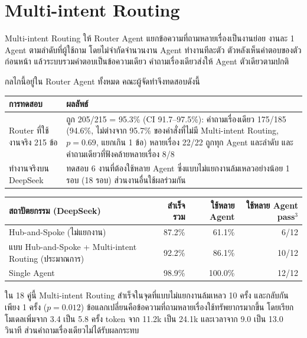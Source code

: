 \documentclass[12pt,a4paper]{article}
\begin{document}
\section{Multi-intent Routing}

Multi-intent Routing ให้ Router Agent แยกข้อความที่ถามหลายเรื่องเป็นงานย่อย งานละ 1 Agent ตามลำดับที่ผู้ใช้ถาม โดยไม่จำกัดจำนวนงาน Agent ทำงานทีละตัว ตัวหลังเห็นคำตอบของตัวก่อนหน้า แล้วระบบรวมคำตอบเป็นข้อความเดียว คำถามเรื่องเดียวส่งให้ Agent ตัวเดียวตามปกติ

กลไกนี้อยู่ใน Router Agent ทั้งหมด คณะผู้จัดทำจึงทดสอบดังนี้

\begin{table}[H]
\centering
\small
\begin{tabular}{L{4.3cm}L{11cm}}
\toprule
\textbf{การทดสอบ} & \textbf{ผลลัพธ์} \\
\midrule
Router ที่ใช้งานจริง 215 ข้อ & ถูก 205/215 = 95.3\% (CI 91.7--97.5\%): คำถามเรื่องเดียว 175/185 (94.6\%, ไม่ต่างจาก 95.7\% ของคำสั่งที่ไม่มี Multi-intent Routing, $p = 0.69$, แยกเกิน 1 ข้อ) หลายเรื่อง 22/22 ถูกทุก Agent และลำดับ และคำถามเดียวที่ฟังคล้ายหลายเรื่อง 8/8 \\
ทำงานจริงบน DeepSeek & ทดสอบ 6 งานที่ต้องใช้หลาย Agent ซึ่งแบบไม่แยกงานล้มเหลวอย่างน้อย 1 รอบ (18 รอบ) ส่วนงานอื่นใช้ผลร่วมกัน \\
\bottomrule
\end{tabular}
\end{table}

\begin{table}[H]
\centering
\small
\begin{tabular}{L{6.4cm}rrr}
\toprule
\textbf{สถาปัตยกรรม (DeepSeek)} & \textbf{สำเร็จรวม} & \textbf{ใช้หลาย Agent} & \textbf{ใช้หลาย Agent pass$^3$} \\
\midrule
Hub-and-Spoke (ไม่แยกงาน) & 87.2\% & 61.1\% & 6/12 \\
แบบ Hub-and-Spoke + Multi-intent Routing (ประมาณการ) & 92.2\% & 86.1\% & 10/12 \\
Single Agent & 98.9\% & 100.0\% & 12/12 \\
\bottomrule
\end{tabular}
\end{table}

ใน 18 คู่นี้ Multi-intent Routing สำเร็จในจุดที่แบบไม่แยกงานล้มเหลว 10 ครั้ง และกลับกันเพียง 1 ครั้ง ($p = 0.012$) ข้อแลกเปลี่ยนคือข้อความที่ถามหลายเรื่องใช้ทรัพยากรมากขึ้น โดยเรียกโมเดลเพิ่มจาก 3.4 เป็น 5.8 ครั้ง token จาก 11.2k เป็น 24.1k และเวลาจาก 9.0 เป็น 13.0 วินาที ส่วนคำถามเรื่องเดียวไม่ได้รับผลกระทบ
\end{document}
